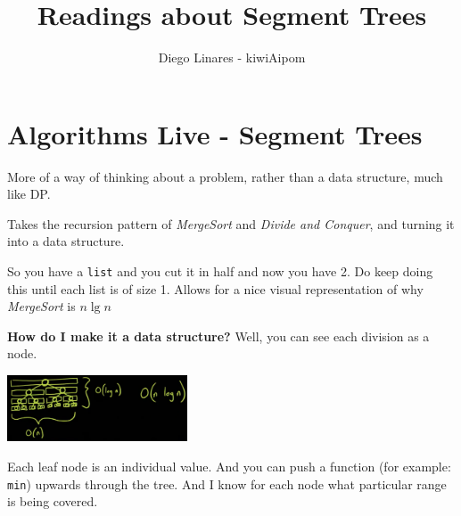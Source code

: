 \documentclass{IEEEtran}
\title{Readings about Segment Trees}
\author{Diego Linares - kiwiAipom}
\begin{document}
  \maketitle
  \section{Algorithms Live - Segment Trees}
    More of a way of thinking about a problem, rather than a data structure, much like DP.\par 
    Takes the recursion pattern of \textit{MergeSort} and \textit{Divide and Conquer}, and turning it into a data structure.\par
    So you have a \texttt{list} and you cut it in half and now you have 2. Do keep doing this until each list is of size 1. Allows for a nice visual representation of why \textit{MergeSort} is $n\lg{n}$\par 
    \textbf{How do I make it a data structure?} Well, you can see each division as a node. 
    \begin{center}
      \includegraphics[width=0.40\textwidth]{intoStructure.png}
    \end{center}
    \par Each leaf node is an individual value. And you can push a function (for example: \texttt{min}) upwards through the tree. And I know for each node what particular range is being covered.
\end{document}
